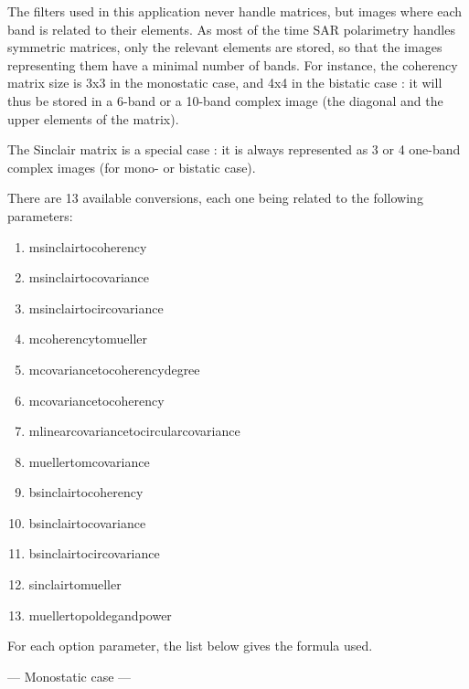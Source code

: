 The filters used in this application never handle matrices, but images where
each band is related to their elements.  As most of the time SAR polarimetry
handles symmetric matrices, only the relevant elements are stored, so that the
images representing them have a minimal number of bands.  For instance, the
coherency matrix size is 3x3 in the monostatic case, and 4x4 in the bistatic
case : it will thus be stored in a 6-band or a 10-band complex image (the
diagonal and the upper elements of the matrix).

The Sinclair matrix is a special case : it is always represented as 3 or 4
one-band complex images (for mono- or bistatic case).

There are 13 available conversions, each one being related to the following  parameters:
\begin{enumerate}
\item msinclairtocoherency
\item msinclairtocovariance
\item msinclairtocircovariance
\item mcoherencytomueller
\item mcovariancetocoherencydegree
\item mcovariancetocoherency
\item mlinearcovariancetocircularcovariance
\item muellertomcovariance
\item bsinclairtocoherency
\item bsinclairtocovariance
\item bsinclairtocircovariance
\item sinclairtomueller
\item muellertopoldegandpower
\end{enumerate}

For each option parameter, the list below gives the formula used.

--- Monostatic case ---

